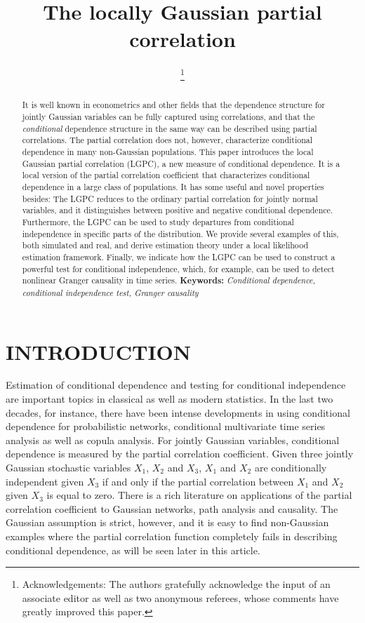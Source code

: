 \documentclass[
  12pt,
  letterpaper]{article}
\title{The locally Gaussian partial correlation}
\author{\footnote{{Acknowledgements:} The authors gratefully acknowledge the input of an associate editor as well as two anonymous referees, whose comments have greatly improved this paper.}}
\date{}
\theoremstyle{definition}
\theoremstyle{definition}
\theoremstyle{definition}
\theoremstyle{remark}
\begin{document}
\maketitle
\begin{abstract}
It is well known in econometrics and other fields that the dependence structure for jointly Gaussian variables can be fully captured using correlations, and that the \textit{conditional} dependence structure in the same way can be described using partial correlations. The partial correlation does not, however, characterize conditional dependence in many non-Gaussian populations. This paper introduces the local Gaussian partial correlation (LGPC), a new measure of conditional dependence. It is a local version of the partial correlation coefficient that characterizes conditional dependence in a large class of populations. It has some useful and novel properties besides: The LGPC reduces to the ordinary partial correlation for jointly normal variables, and it distinguishes between positive and negative conditional dependence. Furthermore, the LGPC can be used to study departures from conditional independence in specific parts of the distribution. We provide several examples of this, both simulated and real, and derive estimation theory under a local likelihood estimation framework. Finally, we indicate how the LGPC can be used to construct a powerful test for conditional independence, which, for example, can be used to detect nonlinear Granger causality in time series. \newline \textbf{Keywords:} \emph{Conditional dependence, conditional independence test, Granger causality}
\end{abstract}

\hypertarget{introduction}{%
\section{INTRODUCTION}\label{introduction}}

Estimation of conditional dependence and testing for conditional independence are important topics in classical as well as modern statistics. In the last two decades, for instance, there have been intense developments in using conditional dependence for probabilistic networks, conditional multivariate time series analysis as well as copula analysis. For jointly Gaussian variables, conditional dependence is measured by the partial correlation coefficient. Given three jointly Gaussian stochastic variables \(X_1\), \(X_2\) and \(X_3\), \(X_1\) and \(X_2\) are conditionally independent given \(X_3\) if and only if the partial correlation between \(X_1\) and \(X_2\) given \(X_3\) is equal to zero. There is a rich literature on applications of the partial correlation coefficient to Gaussian networks, path analysis and causality. The Gaussian assumption is strict, however, and it is easy to find non-Gaussian examples where the partial correlation function completely fails in describing conditional dependence, as will be seen later in this article.
\end{document}
